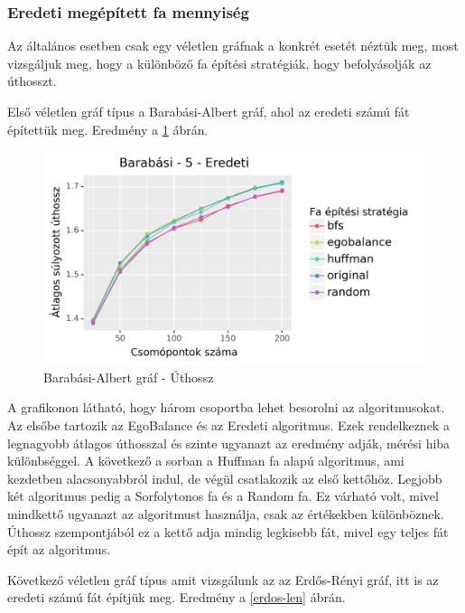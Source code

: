 \documentclass[12pt]{report}
\begin{document}
\subsubsection{Eredeti megépített fa mennyiség}

Az általános esetben csak egy véletlen gráfnak a konkrét esetét néztük meg, most vizsgáljuk meg, hogy a különböző fa építési stratégiák, hogy befolyásolják az úthosszt.

Első véletlen gráf típus a Barabási-Albert gráf, ahol az eredeti számú fát építettük meg. 
Eredmény a \ref{barabasi-len} ábrán.

\begin{figure}[H]
	\begin{center}
		\includegraphics[width=0.9\linewidth]{pictures/barabasi_len_e.png}
		\caption{Barabási-Albert gráf - Úthossz}
		\label{barabasi-len}
	\end{center}
\end{figure}

A grafikonon látható, hogy három csoportba lehet besorolni az algoritmusokat. 
Az elsőbe tartozik az EgoBalance és az Eredeti algoritmus.
Ezek rendelkeznek a legnagyobb átlagos úthosszal és szinte ugyanazt az eredmény adják, mérési hiba különbséggel.
A következő a sorban a Huffman fa alapú algoritmus, ami kezdetben alacsonyabbról indul, de végül csatlakozik az első kettőhöz.
Legjobb két algoritmus pedig a Sorfolytonos fa és a Random fa.
Ez várható volt, mivel mindkettő ugyanazt az algoritmust használja, csak az értékekben különböznek.
Úthossz szempontjából ez a kettő adja mindig legkisebb fát, mivel egy teljes fát épít az algoritmus.


Következő véletlen gráf típus amit vizsgálunk az az Erdős-Rényi gráf, itt is az eredeti számú fát építjük meg.
Eredmény a \ref{erdos-len} ábrán.
\end{document}
